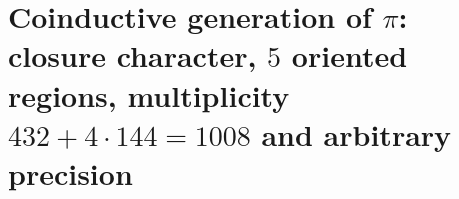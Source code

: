 \HMTFlushCurrentChapter
\chapter{Coinductive generation of \texorpdfstring{\(\pi\)}{pi}: closure character, \(5\) oriented regions, multiplicity \texorpdfstring{\(432+4\cdot144=1008\)}{432+4x144=1008} and arbitrary precision}%
\begingroup
\renewcommand{\chapter}[2][]{}%
%
\endgroup

\HMTFlushCurrentChapter
\chapter{Coinductive generation of \texorpdfstring{\(e\)}{e}: exponential character, factorial semigroup, and phase return with state memory}%
\begingroup
\renewcommand{\chapter}[2][]{}%
%
\endgroup

\HMTFlushCurrentChapter
\chapter{Coinductive generation of \texorpdfstring{\(\varphi\)}{phi}: modal incidence, positive Perron ray, and uniqueness of self-scaling}%
\begingroup
\renewcommand{\chapter}[2][]{}%
%
\endgroup

